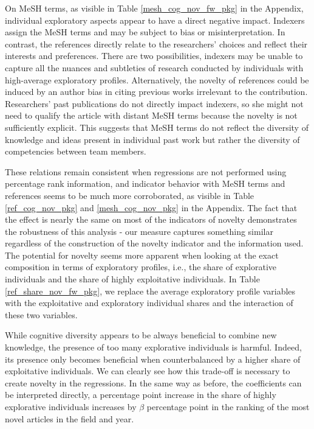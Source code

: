 On MeSH terms, as visible in Table \ref{mesh_cog_nov_fw_pkg} in the Appendix, individual exploratory aspects appear to have a direct negative impact. Indexers assign the MeSH terms and may be subject to bias or misinterpretation. In contrast, the references directly relate to the researchers' choices and reflect their interests and preferences. There are two possibilities, indexers may be unable to capture all the nuances and subtleties of research conducted by individuals with high-average exploratory profiles. Alternatively, the novelty of references could be induced by an author bias in citing previous works irrelevant to the contribution. Researchers' past publications do not directly impact indexers, so she might not need to qualify the article with distant MeSH terms because the novelty is not sufficiently explicit. This suggests that MeSH terms do not reflect the diversity of knowledge and ideas present in individual past work but rather the diversity of competencies between team members.

These relations remain consistent when regressions are not performed using percentage rank information, and indicator behavior with MeSH terms and references seems to be much more corroborated, as visible in Table \ref{ref_cog_nov_pkg} and \ref{mesh_cog_nov_pkg} in the Appendix. The fact that the effect is nearly the same on most of the indicators of novelty demonstrates the robustness of this analysis - our measure captures something similar regardless of the construction of the novelty indicator and the information used.\\

The potential for novelty seems more apparent when looking at the exact composition in terms of exploratory profiles, i.e., the share of explorative individuals and the share of highly exploitative individuals.
In Table \ref{ref_share_nov_fw_pkg}, we replace the average exploratory profile variables with the exploitative and exploratory individual shares and the interaction of these two variables.



While cognitive diversity appears to be always beneficial to combine new knowledge, the presence of too many explorative individuals is harmful. Indeed, its presence only becomes beneficial when counterbalanced by a higher share of exploitative individuals. We can clearly see how this trade-off is necessary to create novelty in the regressions. In the same way as before, the coefficients can be interpreted directly, a percentage point increase in the share of highly explorative individuals increases by $\beta$ percentage point in the ranking of the most novel articles in the field and year.

